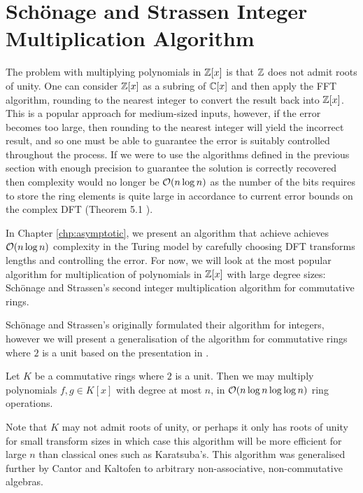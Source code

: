 \section{Sch\"{o}nage and Strassen Integer Multiplication Algorithm}
\label{sec:schon-strass}

The problem with multiplying polynomials in ${\mathbb Z}[x]$ is that ${\mathbb Z}$ does not admit roots of unity. One can consider ${\mathbb Z}[x]$ as a subring of ${\mathbb C}[x]$ and then apply the FFT algorithm, rounding to the nearest integer to convert the result back into ${\mathbb Z}[x]$. This is a popular approach for medium-sized inputs, however, if the error becomes too large, then rounding to the nearest integer will yield the incorrect result, and so one must be able to guarantee the error is suitably controlled throughout the process. If we were to use the algorithms defined in the previous section with enough precision to guarantee the solution is correctly recovered then complexity would no longer be $\mathcal O(n \log n)$ as the number of the bits requires to store the ring elements is quite large in accordance to current error bounds on the complex DFT (Theorem 5.1 \cite{fft-error}).

In Chapter \ref{chp:asymptotic}, we present an algorithm that achieve achieves $\mathcal O(n\log n)$ complexity in the Turing model by carefully choosing DFT transforms lengths and controlling the error. For now, we will look at the most popular algorithm for multiplication of polynomials in ${\mathbb Z}[x]$ with large degree sizes: Sch\"{o}nage and Strassen's second integer multiplication algorithm for commutative rings. 

Sch\"{o}nage and Strassen's originally formulated their algorithm for integers, however we will present a generalisation of the algorithm for commutative rings where $2$ is a unit based on the presentation in \cite{modern-comp-alg}.

\medskip


\begin{theorem}
    Let $K$ be a commutative rings where $2$ is a unit. Then we may multiply polynomials $f, g \in K[x]$ with degree at most $n$, in $\mathcal O(n \log n \log \log n)$ ring operations.
\end{theorem}

Note that $K$ may not admit roots of unity, or perhaps it only has roots of unity for small transform sizes in which case this algorithm will be more efficient for large $n$ than classical ones such as Karatsuba's. This algorithm was generalised further by Cantor and Kaltofen to arbitrary non-associative, non-commutative algebras\cite{cantor-kaltofen}.

